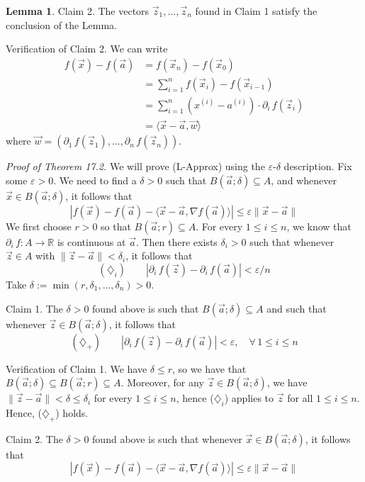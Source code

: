 \documentclass[11pt]{article}
\makeatletter
\theoremstyle{definition}
\newtheorem{lemma}[thm]{Lemma}
\newcommand{\R}{\ensuremath{\mathbb{R}}}
\newenvironment{pf}[1][\proofname]{\par
  \pushQED{\qed}%
  \normalfont \topsep0\p@\relax
  \trivlist
  \item[\hskip\labelsep\itshape
  #1\@addpunct{.}]\ignorespaces
}{%
  \popQED\endtrivlist\@endpefalse
}
\makeatother
\begin{document}
\begin{lemma}
\begin{pf}
{\sc Claim 2.} The vectors $\vec{z}_1, \dots, \vec{z}_n$ found in Claim 1 satisfy the conclusion of the Lemma.

{\sc Verification of Claim 2.} We can write
\begin{align*}
    f(\vec{x}) - f(\vec{a}) &= f(\vec{x}_n) - f(\vec{x}_0) \\
    &= \textstyle\sum_{i=1}^n f(\vec{x}_i) - f(\vec{x}_{i-1}) \\
    &= \textstyle\sum_{i=1}^n (x^{(i)} - a^{(i)}) \cdot \partial_i\,f(\vec{z}_i) \\
    &= \langle \vec{x} - \vec{a}, \vec{w} \rangle
\end{align*}
where $\vec{w} = (\partial_1\,f(\vec{z}_1), \dots, \partial_n\,f(\vec{z}_n))$.
\end{pf}
\end{lemma}

\emph{Proof of Theorem 17.2.} We will prove (L-Approx) using the $\varepsilon$-$\delta$ description. Fix some $\varepsilon > 0$. We need to find a $\delta > 0$ such that $B(\vec{a}; \delta) \subseteq A$, and whenever $\vec{x} \in B(\vec{a}; \delta)$, it follows that
$$|f(\vec{x}) - f(\vec{a}) - \langle \vec{x} - \vec{a}, \nabla f(\vec{a}) \rangle| \leq \varepsilon \|\vec{x} - \vec{a}\|$$
We first choose $r > 0$ so that $B(\vec{a}; r) \subseteq A$. For every $1 \leq i \leq n$, we know that $\partial_i\, f : A \to \R$ is continuous at $\vec{a}$. Then there exists $\delta_i > 0$ such that whenever $\vec{z} \in A$ with $\|\vec{z} - \vec{a}\| < \delta_i$, it follows that
$$(\diamondsuit_i) \qquad |\partial_i\,f(\vec{z}) - \partial_i\,f(\vec{a})| < \varepsilon / n$$
Take $\delta := \min(r, \delta_1, \dots, \delta_n) > 0$. 

{\sc Claim 1.} The $\delta > 0$ found above is such that $B(\vec{a}; \delta) \subseteq A$ and such that whenever $\vec{z} \in B(\vec{a}; \delta)$, it follows that
$$(\diamondsuit_+) \qquad |\partial_i\,f(\vec{z}) - \partial_i\,f(\vec{a})| < \varepsilon, \quad \forall \, 1 \leq i \leq n$$

{\sc Verification of Claim 1.} We have $\delta \leq r$, so we have that $B(\vec{a}; \delta) \subseteq B(\vec{a}; r) \subseteq A$. Moreover, for any $\vec{z} \in B(\vec{a}; \delta)$, we have $\|\vec{z} - \vec{a}\| < \delta \leq \delta_i$ for every $1 \leq i \leq n$, hence ($\diamondsuit_i$) applies to $\vec{z}$ for all $1 \leq i \leq n$. Hence, ($\diamondsuit_+$) holds.

{\sc Claim 2.} The $\delta > 0$ found above is such that whenever $\vec{x} \in B(\vec{a}; \delta)$, it follows that
$$|f(\vec{x}) - f(\vec{a}) - \langle \vec{x} - \vec{a}, \nabla f(\vec{a}) \rangle| \leq \varepsilon \|\vec{x} - \vec{a}\|$$
\end{document}

